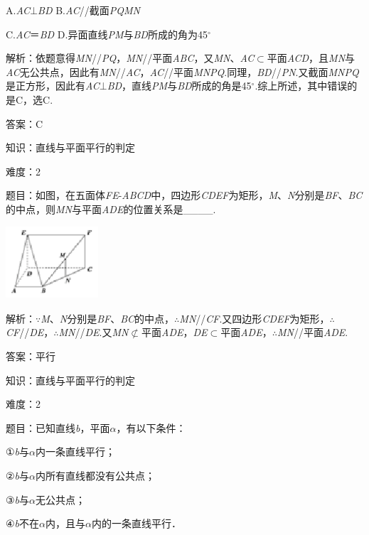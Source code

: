 \documentclass{article} %
\begin{document}
A.\textit{AC}$\mathrm{\bot}$\textit{BD  }B.\textit{AC}//截面\textit{PQMN}

C.\textit{AC}＝\textit{BD  }D.异面直线\textit{PM}与\textit{BD}所成的角为45$\mathrm{{}^\circ}$

解析：依题意得\textit{MN}//\textit{PQ}，\textit{MN}//平面\textit{ABC}，又\textit{MN}、\textit{AC}$\mathrm{\subset }$平面\textit{ACD}，且\textit{MN}与\textit{AC}无公共点，因此有\textit{MN}//\textit{AC}，\textit{AC}//平面\textit{MNPQ}.同理，\textit{BD}//\textit{PN}.又截面\textit{MNPQ}是正方形，因此有\textit{AC}$\mathrm{\bot}$\textit{BD}，直线\textit{PM}与\textit{BD}所成的角是45$\mathrm{{}^\circ}$.综上所述，其中错误的是C，选C.

答案：C

知识：直线与平面平行的判定

难度：2

题目：如图，在五面体\textit{FE}-\textit{ABCD}中，四边形\textit{CDEF}为矩形，\textit{M}、\textit{N}分别是\textit{BF}、\textit{BC}的中点，则\textit{MN}与平面\textit{ADE}的位置关系是\_\_\_\_.

\includegraphics*[width=1.35in, height=1.06in, keepaspectratio=false]{image139}

解析：$\mathrm{\because}$\textit{M}、\textit{N}分别是\textit{BF}、\textit{BC}的中点，$\mathrm{\therefore}$\textit{MN}//\textit{CF}.又四边形\textit{CDEF}为矩形，$\mathrm{\therefore}$\textit{CF}//\textit{DE}，$\mathrm{\therefore}$\textit{MN}//\textit{DE}.又\textit{MN}$\mathrm{\nsubset}$平面\textit{ADE}，\textit{DE}$\mathrm{\subset }$平面\textit{ADE}，$\mathrm{\therefore}$\textit{MN}//平面\textit{ADE}.

答案：平行

知识：直线与平面平行的判定

难度：2

题目：已知直线\textit{b}，平面\textit{$\alpha$}，有以下条件：

①\textit{b}与\textit{$\alpha$}内一条直线平行；

②\textit{b}与\textit{$\alpha$}内所有直线都没有公共点；

③\textit{b}与\textit{$\alpha$}无公共点；

④\textit{b}不在\textit{$\alpha$}内，且与\textit{$\alpha$}内的一条直线平行．
\end{document}
